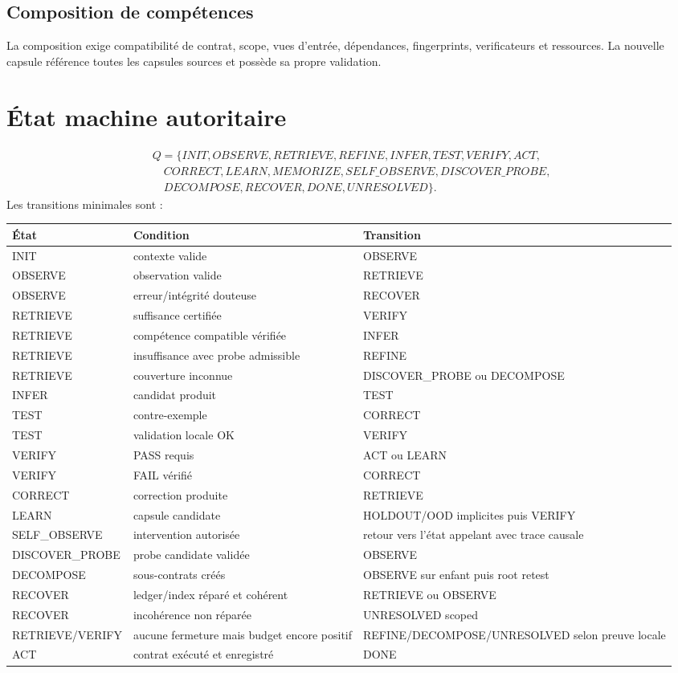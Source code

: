 \documentclass[11pt,a4paper]{report}
\begin{document}
\section{Composition de compétences}
La composition exige compatibilité de contrat, scope, vues d'entrée, dépendances, fingerprints, verificateurs et ressources. La nouvelle capsule référence toutes les capsules sources et possède sa propre validation.

\chapter{État machine autoritaire}
\[
\begin{aligned}
Q=\{INIT,OBSERVE,RETRIEVE,REFINE,INFER,TEST,VERIFY,ACT,\\
\quad CORRECT,LEARN,MEMORIZE,SELF\_OBSERVE,DISCOVER\_PROBE,\\
\quad DECOMPOSE,RECOVER,DONE,UNRESOLVED\}.
\end{aligned}
\]
Les transitions minimales sont :
\small\begin{longtable}{L{0.22\textwidth}L{0.24\textwidth}L{0.44\textwidth}}
\toprule État & Condition & Transition \\ \midrule
INIT & contexte valide & OBSERVE \\
OBSERVE & observation valide & RETRIEVE \\
OBSERVE & erreur/intégrité douteuse & RECOVER \\
RETRIEVE & suffisance certifiée & VERIFY \\
RETRIEVE & compétence compatible vérifiée & INFER \\
RETRIEVE & insuffisance avec probe admissible & REFINE \\
RETRIEVE & couverture inconnue & DISCOVER\_PROBE ou DECOMPOSE \\
INFER & candidat produit & TEST \\
TEST & contre-exemple & CORRECT \\
TEST & validation locale OK & VERIFY \\
VERIFY & PASS requis & ACT ou LEARN \\
VERIFY & FAIL vérifié & CORRECT \\
CORRECT & correction produite & RETRIEVE \\
LEARN & capsule candidate & HOLDOUT/OOD implicites puis VERIFY \\
SELF\_OBSERVE & intervention autorisée & retour vers l'état appelant avec trace causale \\
DISCOVER\_PROBE & probe candidate validée & OBSERVE \\
DECOMPOSE & sous-contrats créés & OBSERVE sur enfant puis root retest \\
RECOVER & ledger/index réparé et cohérent & RETRIEVE ou OBSERVE \\
RECOVER & incohérence non réparée & UNRESOLVED scoped \\
RETRIEVE/VERIFY & aucune fermeture mais budget encore positif & REFINE/DECOMPOSE/UNRESOLVED selon preuve locale \\
ACT & contrat exécuté et enregistré & DONE \\
\bottomrule
\end{longtable}
\end{document}
